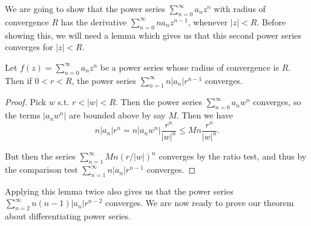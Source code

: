 We are going to show that the power series $\sum_{n = 0}^{\infty} a_n z^n$ with radius of convergence $R$ has the derivative $\sum_{n = 0}^{\infty} n a_n z^{n - 1}$, whenever $|z| < R$.
Before showing this, we will need a lemma which gives us that this second power series converges for $|z| < R$.


\begin{lemma}
	Let $f(z) = \sum_{n = 0}^{\infty} a_n z^n$ be a power series whose radius of convergence is $R$. 
	Then if $0 < r < R$, the power series $\sum_{n = 1}^{\infty} n |a_n|r^{n - 1}$ converges.
\end{lemma}
\begin{proof}
	Pick $w$ s.t. $r < |w| < R$. Then the power series $\sum_{n = 0}^{\infty} a_n w^n$ converges, so the terms $|a_n w^n|$ are bounded above by say $M$. Then we have
	$$
	n|a_n|r^n = n|a_n w^n| \frac{r^n}{|w|^n} \leq M n \frac{r^n}{|w|^n}.
	$$

	But then the series $\sum_{n = 1}^{\infty} Mn (r/|w|)^n$ converges by the ratio test, and thus by the comparison test $\sum_{n = 1}^{\infty} n |a_n| r^{n - 1}$ converges.
\end{proof}

Applying this lemma twice also gives us that the power series
$
\sum_{n = 2}^{\infty} n(n - 1) |a_n| r^{n - 2}
$
converges. We are now ready to prove our theorem about differentiating power series.


